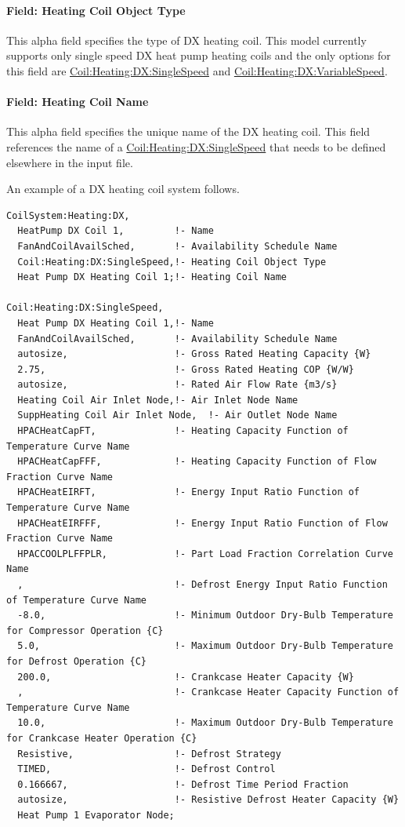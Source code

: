 \paragraph{Field: Heating Coil Object Type}\label{field-heating-coil-object-type-000}

This alpha field specifies the type of DX heating coil. This model currently supports only single speed DX heat pump heating coils and the only options for this field are \hyperref[coilheatingdxsinglespeed]{Coil:Heating:DX:SingleSpeed} and \hyperref[coilheatingdxvariablespeed]{Coil:Heating:DX:VariableSpeed}.

\paragraph{Field: Heating Coil Name}\label{field-heating-coil-name-000}

This alpha field specifies the unique name of the DX heating coil. This field references the name of a \hyperref[coilheatingdxsinglespeed]{Coil:Heating:DX:SingleSpeed} that needs to be defined elsewhere in the input file.

An example of a DX heating coil system follows.

\begin{lstlisting}
CoilSystem:Heating:DX,
  HeatPump DX Coil 1,         !- Name
  FanAndCoilAvailSched,       !- Availability Schedule Name
  Coil:Heating:DX:SingleSpeed,!- Heating Coil Object Type
  Heat Pump DX Heating Coil 1;!- Heating Coil Name

Coil:Heating:DX:SingleSpeed,
  Heat Pump DX Heating Coil 1,!- Name
  FanAndCoilAvailSched,       !- Availability Schedule Name
  autosize,                   !- Gross Rated Heating Capacity {W}
  2.75,                       !- Gross Rated Heating COP {W/W}
  autosize,                   !- Rated Air Flow Rate {m3/s}
  Heating Coil Air Inlet Node,!- Air Inlet Node Name
  SuppHeating Coil Air Inlet Node,  !- Air Outlet Node Name
  HPACHeatCapFT,              !- Heating Capacity Function of Temperature Curve Name
  HPACHeatCapFFF,             !- Heating Capacity Function of Flow Fraction Curve Name
  HPACHeatEIRFT,              !- Energy Input Ratio Function of Temperature Curve Name
  HPACHeatEIRFFF,             !- Energy Input Ratio Function of Flow Fraction Curve Name
  HPACCOOLPLFFPLR,            !- Part Load Fraction Correlation Curve Name
  ,                           !- Defrost Energy Input Ratio Function of Temperature Curve Name
  -8.0,                       !- Minimum Outdoor Dry-Bulb Temperature for Compressor Operation {C}
  5.0,                        !- Maximum Outdoor Dry-Bulb Temperature for Defrost Operation {C}
  200.0,                      !- Crankcase Heater Capacity {W}
  ,                           !- Crankcase Heater Capacity Function of Temperature Curve Name
  10.0,                       !- Maximum Outdoor Dry-Bulb Temperature for Crankcase Heater Operation {C}
  Resistive,                  !- Defrost Strategy
  TIMED,                      !- Defrost Control
  0.166667,                   !- Defrost Time Period Fraction
  autosize,                   !- Resistive Defrost Heater Capacity {W}
  Heat Pump 1 Evaporator Node;
\end{lstlisting}

